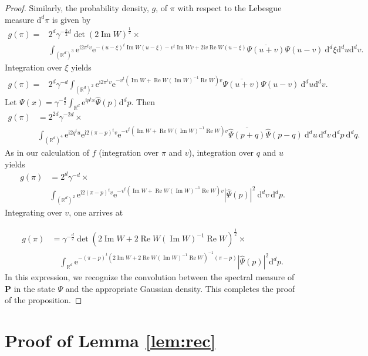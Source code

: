\documentclass[12pt]{article}
\renewcommand{\Re}{\operatorname{Re}}
\renewcommand{\Im}{\operatorname{Im}}
\renewcommand\i{\mathrm{i}}
\newcommand{\e}{{\mathrm e}}
\renewcommand{\d}{{\mathrm d}}
\begin{document}
\begin{proof}
	Similarly, the probability density, $g$, of $\pi$ with respect to the Lebesgue measure $\d^{d} \pi$ is given by
	\begin{align*}
	g(\pi)=&2^d\gamma^{-\frac32d}\det(2\Im W)^{\frac12}\times\\
	&\int_{(\mathbb R^d)^3}\e^{\i2\pi^tv}\e^{-(u-\xi)^t\Im W(u-\xi) -v^t\Im Wv +2\i v\Re W(u-\xi)}\overline{\Psi(u+v)}\Psi(u-v)\ \d^{d}\xi\d^{d} u \d^{d} v.
	\end{align*}
	Integration over $\xi$ yields
	\begin{align*}
	g(\pi)=&2^d\gamma^{-d}\int_{(\mathbb R^d)^2}\e^{\i2\pi^tv}\e^{-v^t(\Im W +\Re W(\Im W)^{-1}\Re W)v}\overline{\Psi(u+v)}\Psi(u-v)\ \d^{d} u \d^{d} v.
	\end{align*}
	Let $\Psi(x)=\gamma^{-\frac d2}\int_{\mathbb R^d} \e^{\i p^tx} \widehat{\Psi}(p)\d^{d} p$. Then
	\begin{align*}
	g(\pi)& = 2^{2d}\gamma^{-2d}\times\\
	&\int_{(\mathbb R^d)^4}\e^{\i 2q^tu}\e^{\i 2(\pi-p)^tv}\e^{-v^t(\Im W +\Re W(\Im W)^{-1}\Re W)v}\overline{\widehat{\Psi}(p+q)}\widehat{\Psi}(p-q)\ \d^{d} u\, \d^{d} v\, \d^{d} p\ \d^{d} q.
	\end{align*}
	As in our calculation of $f$ (integration over $\pi$ and $v$), integration over $q$ and $u$ yields
	\begin{align*}
	g(\pi)&=2^{d}\gamma^{-d}\times\\
	&\int_{(\mathbb R^d)^2}\e^{\i2(\pi-p)^tv}\e^{-v^t(\Im W +\Re W(\Im W)^{-1}\Re W)v}|\widehat{\Psi}(p)|^2\ \d^{d} v \,\d^{d} p.
	\end{align*}
	Integrating over $v$, one arrives at 

	\begin{align*}
	g(\pi)&=\gamma^{-\frac d2}\det(2\Im W +2\Re W(\Im W)^{-1}\Re W)^{\frac12}\times\\
	&\quad\int_{\mathbb R^d}\e^{-(\pi-p)^t( {2}\Im W+
	{2}\Re W(\Im W)^{-1}\Re W)^{-1}(\pi-p)}|\widehat{\Psi}(p)|^2\d^{d} p.
	\end{align*}
	In this expression, we recognize the convolution between the spectral measure of $\mathbf P$ in the state $\Psi$ and the appropriate Gaussian density. This completes the proof of the proposition.
\end{proof}

\section{Proof of Lemma \ref{lem:rec}}\label{Pf}
\end{document}
